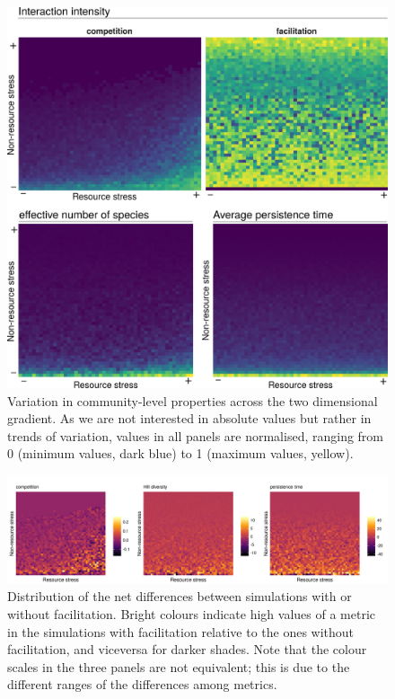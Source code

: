 \begin{figure}[!ht]
\centering
\includegraphics[width=\textwidth]{./Figures/Appendix6_1/Fig_3.png}
\caption[Two-dimensional community variability]{\color{Gray} Variation in community-level properties across the two dimensional gradient. As we are not interested in absolute values but rather in trends of variation, values in all panels are normalised, ranging from 0 (minimum values, dark blue) to 1 (maximum values, yellow).}
\label{fig:figApp6.1.3}
\end{figure}

\begin{figure}[!ht]
\centering
\includegraphics[width=\textwidth]{./Figures/Appendix6_1/Fig_4.png}
\caption[Facilitation impacts]{\color{Gray} Distribution of the net differences between simulations with or without facilitation. Bright colours indicate high values of a metric in the simulations with facilitation relative to the ones without facilitation, and viceversa for darker shades. Note that the colour scales in the three panels are not equivalent; this is due to the different ranges of the differences among metrics.}
\label{fig:figApp6.1.4}
\end{figure}
